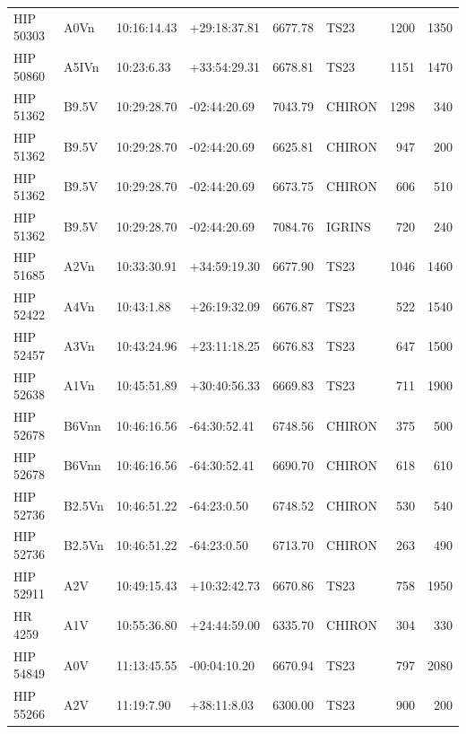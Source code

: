 \documentclass{emulateapj}
\begin{document}
\begin{longtable*}{|l|lllrlrr|}
   HIP 50303 &           A0Vn &    10:16:14.43 &   +29:18:37.81 &  6677.78 &       TS23 &     1200 &    1350 \\
   HIP 50860 &          A5IVn &     10:23:6.33 &   +33:54:29.31 &  6678.81 &       TS23 &     1151 &    1470 \\
   HIP 51362 &          B9.5V &    10:29:28.70 &   -02:44:20.69 &  7043.79 &     CHIRON &     1298 &     340 \\
   HIP 51362 &          B9.5V &    10:29:28.70 &   -02:44:20.69 &  6625.81 &     CHIRON &      947 &     200 \\
   HIP 51362 &          B9.5V &    10:29:28.70 &   -02:44:20.69 &  6673.75 &     CHIRON &      606 &     510 \\
   HIP 51362 &          B9.5V &    10:29:28.70 &   -02:44:20.69 &  7084.76 &     IGRINS &      720 &     240 \\
   HIP 51685 &           A2Vn &    10:33:30.91 &   +34:59:19.30 &  6677.90 &       TS23 &     1046 &    1460 \\
   HIP 52422 &           A4Vn &     10:43:1.88 &   +26:19:32.09 &  6676.87 &       TS23 &      522 &    1540 \\
   HIP 52457 &           A3Vn &    10:43:24.96 &   +23:11:18.25 &  6676.83 &       TS23 &      647 &    1500 \\
   HIP 52638 &           A1Vn &    10:45:51.89 &   +30:40:56.33 &  6669.83 &       TS23 &      711 &    1900 \\
   HIP 52678 &          B6Vnn &    10:46:16.56 &   -64:30:52.41 &  6748.56 &     CHIRON &      375 &     500 \\
   HIP 52678 &          B6Vnn &    10:46:16.56 &   -64:30:52.41 &  6690.70 &     CHIRON &      618 &     610 \\
   HIP 52736 &         B2.5Vn &    10:46:51.22 &    -64:23:0.50 &  6748.52 &     CHIRON &      530 &     540 \\
   HIP 52736 &         B2.5Vn &    10:46:51.22 &    -64:23:0.50 &  6713.70 &     CHIRON &      263 &     490 \\
   HIP 52911 &            A2V &    10:49:15.43 &   +10:32:42.73 &  6670.86 &       TS23 &      758 &    1950 \\
     HR 4259 &            A1V &    10:55:36.80 &   +24:44:59.00 &  6335.70 &     CHIRON &      304 &     330 \\
   HIP 54849 &            A0V &    11:13:45.55 &   -00:04:10.20 &  6670.94 &       TS23 &      797 &    2080 \\
   HIP 55266 &            A2V &     11:19:7.90 &    +38:11:8.03 &  6300.00 &       TS23 &      900 &     200 \\

\end{longtable*}
\end{document}
